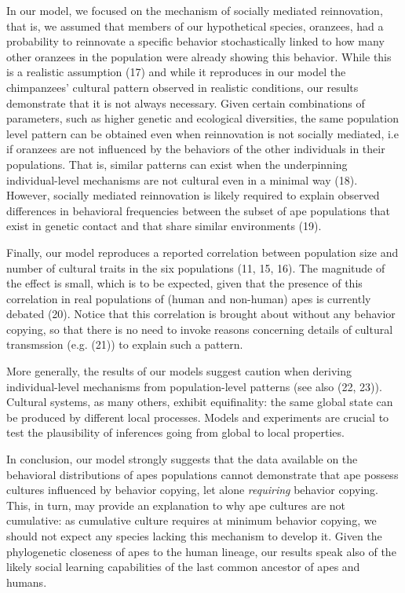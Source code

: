\documentclass[9pt,twocolumn,twoside,]{pnas-new}
\begin{document}
In our model, we focused on the mechanism of socially mediated
reinnovation, that is, we assumed that members of our hypothetical
species, oranzees, had a probability to reinnovate a specific behavior
stochastically linked to how many other oranzees in the population were
already showing this behavior. While this is a realistic assumption (17)
and while it reproduces in our model the chimpanzees' cultural pattern
observed in realistic conditions, our results demonstrate that it is not
always necessary. Given certain combinations of parameters, such as
higher genetic and ecological diversities, the same population level
pattern can be obtained even when reinnovation is not socially mediated,
i.e if oranzees are not influenced by the behaviors of the other
individuals in their populations. That is, similar patterns can exist
when the underpinning individual-level mechanisms are not cultural even
in a minimal way (18). However, socially mediated reinnovation is likely
required to explain observed differences in behavioral frequencies
between the subset of ape populations that exist in genetic contact and
that share similar environments (19).

Finally, our model reproduces a reported correlation between population
size and number of cultural traits in the six populations (11, 15, 16).
The magnitude of the effect is small, which is to be expected, given
that the presence of this correlation in real populations of (human and
non-human) apes is currently debated (20). Notice that this correlation
is brought about without any behavior copying, so that there is no need
to invoke reasons concerning details of cultural transmssion (e.g. (21))
to explain such a pattern.

More generally, the results of our models suggest caution when deriving
individual-level mechanisms from population-level patterns (see also
(22, 23)). Cultural systems, as many others, exhibit equifinality: the
same global state can be produced by different local processes. Models
and experiments are crucial to test the plausibility of inferences going
from global to local properties.

In conclusion, our model strongly suggests that the data available on
the behavioral distributions of apes populations cannot demonstrate that
ape possess cultures influenced by behavior copying, let alone
\emph{requiring} behavior copying. This, in turn, may provide an
explanation to why ape cultures are not cumulative: as cumulative
culture requires at minimum behavior copying, we should not expect any
species lacking this mechanism to develop it. Given the phylogenetic
closeness of apes to the human lineage, our results speak also of the
likely social learning capabilities of the last common ancestor of apes
and humans.
\end{document}
